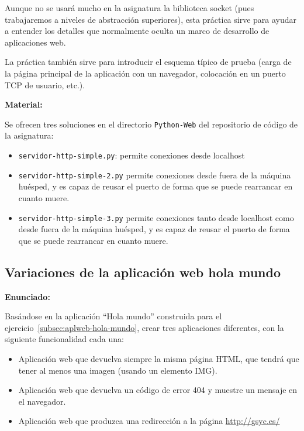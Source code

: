Aunque no se usará mucho en la asignatura la biblioteca socket (pues trabajaremos a niveles de abstracción superiores), esta práctica sirve para ayudar a entender los detalles que normalmente oculta un marco de desarrollo de aplicaciones web.

La práctica también sirve para introducir el esquema típico de prueba (carga de la página principal de la aplicación con un navegador, colocación en un puerto TCP de usuario, etc.).

\textbf{Material:}

Se ofrecen tres soluciones en el directorio \verb|Python-Web| del repositorio de código de la asignatura:

\begin{itemize}
\item \verb|servidor-http-simple.py|: permite conexiones desde localhost
\item \verb|servidor-http-simple-2.py| permite conexiones desde fuera de la máquina huésped, y es capaz de reusar el puerto de forma que se puede rearrancar en cuanto muere.
\item \verb|servidor-http-simple-3.py| permite conexiones tanto desde localhost como desde fuera de la máquina huésped, y es capaz de reusar el puerto de forma que se puede rearrancar en cuanto muere.
\end{itemize}

\subsection{Variaciones de la aplicación web hola mundo}
\label{subsec:aplweb-hola-mundo-var}

\textbf{Enunciado:}

Basándose en la aplicación ``Hola mundo'' construida para el ejercicio~\ref{subsec:aplweb-hola-mundo}, crear tres aplicaciones diferentes, con la siguiente funcionalidad cada una:

\begin{itemize}
\item Aplicación web que devuelva siempre la misma página HTML, que tendrá que tener al menos una imagen (usando un elemento IMG).

\item Aplicación web que devuelva un código de error 404 y muestre un mensaje en el navegador.

\item Aplicación web que produzca una redirección a la página \url{http://gsyc.es/}
\end{itemize}

